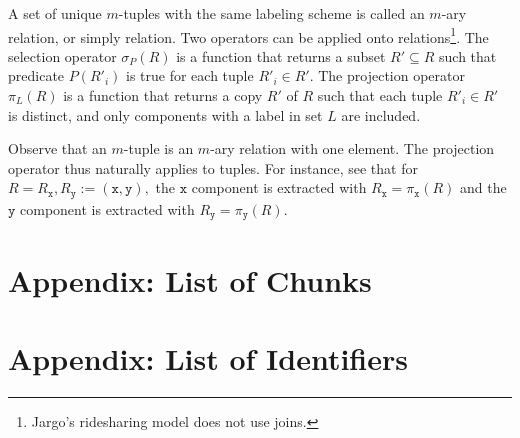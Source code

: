 \documentclass{report}
\theoremstyle{definition}                   %
\begin{document}
A set of unique $m$-tuples with the same labeling scheme is called an $m$-ary
relation, or simply relation. Two operators can be applied onto
relations\footnote{Jargo's ridesharing model does not use joins.}. The
selection operator $\sigma_P(R)$ is a function that returns a subset
$R'\subseteq R$ such that predicate $P(R'_i)$ is true for each tuple $R'_i\in
R'$.  The projection operator $\pi_L(R)$ is a function that returns a copy $R'$
of $R$ such that each tuple $R'_i\in R'$ is distinct, and only components with
a label in set $L$ are included.

Observe that an $m$-tuple is an $m$-ary relation with one element.  The
projection operator thus naturally applies to tuples. For instance, see that
for $R=R_\texttt{x},R_\texttt{y}:=(\texttt{x},\texttt{y}),$ the $\texttt{x}$
component is extracted with $R_\texttt{x}=\pi_\texttt{x}(R)$ and the
$\texttt{y}$ component is extracted with $R_\texttt{y}=\pi_\texttt{y}(R)$.

\chapter{Appendix: List of Chunks}
\nowebchunks

\chapter{Appendix: List of Identifiers}
\nowebindex
\end{document}
